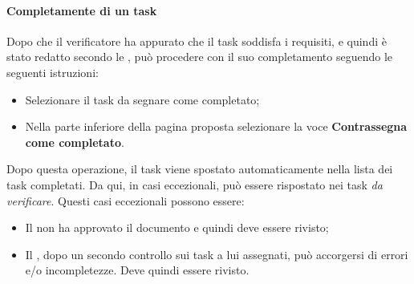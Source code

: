 \paragraph{Completamente di un task}
Dopo che il verificatore ha appurato che il task soddisfa i requisiti, e quindi è stato redatto secondo le
\textsl{\NdP}, può procedere con il suo completamento seguendo le seguenti istruzioni:
\begin{itemize}
  \item Selezionare il task da segnare come completato;
  \item Nella parte inferiore della pagina proposta selezionare la voce \textbf{Contrassegna come 
  completato}.
\end{itemize}
Dopo questa operazione, il task viene spostato automaticamente nella lista dei task completati. Da qui, in
casi eccezionali, può essere rispostato nei task \textsl{da verificare}. Questi casi eccezionali possono essere:
\begin{itemize}
  \item Il \textsl{\RdP} non ha approvato il documento e quindi deve essere 
  rivisto;
  \item Il \textsl{\Ver}, dopo un secondo controllo sui task a lui assegnati, 
  può accorgersi di errori e/o incompletezze. Deve quindi essere rivisto.
\end{itemize}